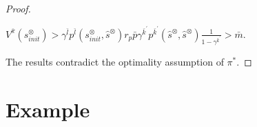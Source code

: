 \documentclass[letterpaper, 10 pt, conference]{ieeeconf}  %
\begin{document}
\begin{proof}
\begin{enumerate}
     $V^{\bar{\pi}}(s^{\otimes}_{init}) > \gamma^{\bar{l}} p^{\bar{l}}(s^{\otimes}_{init}, \hat{s}^{\otimes}) r_p \bar{p} \gamma^{\bar{k}^{\prime}} p^{\bar{k}^{\prime}}(\hat{s}^{\otimes},\hat{s}^{\otimes}) \frac{1}{ 1 - \gamma^{\bar{k}^{\prime}} } > \bar{m}$.
  \end{enumerate}

The results contradict the optimality assumption of $\pi^{\ast}$.
\end{proof}


\section{Example}
\end{document}
